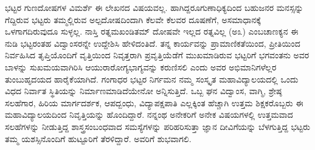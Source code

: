 {ಭಟ್ಟರ ಗುಣದೋಷಗಳ ವಿಮರ್ಶೆ ಈ ಲೇಖನದ ವಿಷಯವಲ್ಲ. ಹಾಗಿದ್ದರೂ\break ಗುಣಾಧಿಕ್ಯದಿಂದ ಬಹುಜನರ ಮನಸ್ಸನ್ನು ಗೆದ್ದಿರುವ ಭಟ್ಟರು ತಮ್ಮಲ್ಲಿರುವ ಅಲ್ಪ\break ದೋಷದಿಂದಾಗಿ ಕೆಲವೇ ಕೆಲವರ ದೂಷಣೆಗೆ, ಅಸಮಾಧಾನಕ್ಕೆ ಒಳಗಾಗದಿರುವುದೂ ಸುಳ್ಳಲ್ಲ. ನಾಸ್ತಿ ರತ್ನಮಖಂಡಿತಮ್ \enginline{-} ದೋಷವೇ ಇಲ್ಲದ ರತ್ನವಿಲ್ಲ (ಅ\enginline{-}೩) ಎಂಬ\break ಚಾಣಕ್ಯನ ಈ ನುಡಿ ಭಟ್ಟರಂತಹ ವಿದ್ವಾಂಸರನ್ನೇ ಉದ್ದೇಶಿಸಿ ಹೇಳಿದಂತಿದೆ. 
ತನ್ನ ಕಾರ್ಯವನ್ನು ಪ್ರಾಮಾಣಿಕತೆಯಿಂದ, ಪ್ರೀತಿಯಿಂದ ನಿರ್ವಹಿಸಿದ ತೃಪ್ತಿಯೊಂದಿಗೆ ವೃತ್ತಿಯಿಂದ ನಿವೃತ್ತರಾಗಿ ಪ್ರವೃತ್ತಿಯೆಡೆಗೆ ಮುಖಮಾಡಿರುವ ಭಟ್ಟರಿಗೆ ಭಗವಂತನು ಅವರ ಬಾಳನ್ನು ಸುಖಮಯವಾಗಿರಿಸಿ ಆಯುರಾರೋಗ್ಯಭಾಗ್ಯವನ್ನು \hbox{ಕರುಣಿಸಲಿ} ಎಂದು ಅವರ ಅಭಿಮಾನಿಗಳೆಲ್ಲರ ತುಂಬುಹೃದಯದ ಹಾರೈಕೆಯಾಗಿದೆ. \hbox{ಗಂಗಾಧರ} ಭಟ್ಟರ ನಿರ್ಗಮನ ನಮ್ಮ ಸಂಸ್ಕೃತ ಮಹಾವಿದ್ಯಾಲಯದಲ್ಲಿ ಒಂದು ವಿಧದ \hbox{ನಿರ್ವಾತ} ಸ್ಥಿತಿಯನ್ನು ನಿರ್ಮಾಣಮಾಡಿದೆಯೇನೋ ಅನ್ನಿಸುತ್ತಿದೆ. ಒಬ್ಬ ಘನ \hbox{ವಿದ್ವಾಂಸ,} ವಾಗ್ಮಿ, ಶ್ರೇಷ್ಠ ಸಲಹೆಗಾರ, ಹಿರಿಯ ಮಾರ್ಗದರ್ಶಕ, ಆಪದ್ಬಂಧು, ವಿದ್ಯಾಪಕ್ಷಪಾತಿ \hbox{ಎಲ್ಲಕ್ಕಿಂತ} ಹೆಚ್ಚಾಗಿ ಉತ್ತಮ ಶಿಕ್ಷಕರೊಬ್ಬರು ಈ ಮಹಾವಿದ್ಯಾಲಯದಿಂದ ನಿವೃತ್ತಿಯನ್ನು  ಹೊಂದಿದ್ದಾರೆ. ನನ್ನಂಥ ಅನೇಕರಿಗೆ ಅನೇಕ ವಿಷಯಗಳಲ್ಲಿ ಉತ್ತಮವಾದ  ಸಲಹೆಗಳನ್ನು ನೀಡುತ್ತಿದ್ದ ಶಾಸ್ತ್ರಸಂಬಂಧವಾದ ಸಮಸ್ಯೆಗಳನ್ನು ಪರಿಹರಿಸುತ್ತಾ ಜ್ಞಾನ \hbox{ದೀವಿಗೆಯನ್ನು} \hbox{ಬೆಳಗುತ್ತಿದ್ದ} ಭಟ್ಟರು ತಮ್ಮ ಯಶಸ್ಸಿನೊಂದಿಗೆ ಹುಟ್ಟೂರಿಗೆ ತೆರಳಿದ್ದಾರೆ. ಅವರಿಗೆ \hbox{ಶುಭವಾಗಲಿ.}


\articleend
}
